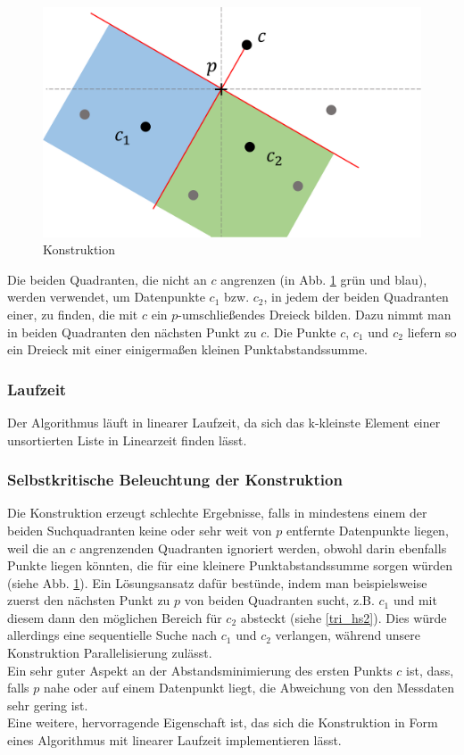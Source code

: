 \documentclass[a4paper]{extarticle}
\begin{document}
    \begin{figure}[!ht]
        \centering	
        \includegraphics[scale=0.15]{bilder/tri_konstr.pdf}
        \caption{Konstruktion}
        \label{fig:konstuktion}
    \end{figure}

    Die beiden Quadranten, die nicht an $c$ angrenzen (in Abb. \ref{fig:konstuktion} grün und blau),
    werden verwendet, um Datenpunkte $c_1$ bzw. $c_2$, in jedem der beiden Quadranten einer, zu 
    finden, die mit $c$ ein $p$-umschließendes Dreieck bilden. Dazu nimmt man in beiden Quadranten 
    den nächsten Punkt zu $c$. Die Punkte $c$, $c_1$ und $c_2$ liefern so ein Dreieck mit einer
    einigermaßen kleinen Punktabstandssumme.

    \subsubsection{Laufzeit}
    Der Algorithmus läuft in linearer Laufzeit, da sich das k-kleinste Element einer unsortierten
    Liste in Linearzeit finden lässt. %

    \subsubsection{Selbstkritische Beleuchtung der Konstruktion}
    Die Konstruktion erzeugt schlechte Ergebnisse, falls in mindestens einem der beiden 
    Suchquadranten keine oder sehr weit von $p$ entfernte Datenpunkte liegen, weil die an $c$ 
    angrenzenden Quadranten ignoriert werden, obwohl darin ebenfalls Punkte liegen könnten, die 
    für eine kleinere Punktabstandssumme sorgen würden (siehe Abb. \ref{fig:konstuktion}).
    Ein Lösungsansatz dafür bestünde, indem man beispielsweise zuerst den nächsten Punkt zu $p$ 
    von beiden Quadranten sucht, z.B. $c_1$ und mit diesem dann den möglichen Bereich für $c_2$ 
    absteckt (siehe \ref{tri_hs2}). Dies würde allerdings eine sequentielle Suche nach $c_1$ und $c_2$ verlangen, 
    während unsere Konstruktion Parallelisierung zulässt. \\
    Ein sehr guter Aspekt an der Abstandsminimierung des ersten Punkts $c$ ist, dass, falls $p$ nahe 
    oder auf einem Datenpunkt liegt, die Abweichung von den Messdaten sehr gering ist. \\
    Eine weitere, hervorragende Eigenschaft ist, das sich die Konstruktion in Form eines Algorithmus 
    mit linearer Laufzeit implementieren lässt.
\end{document}
